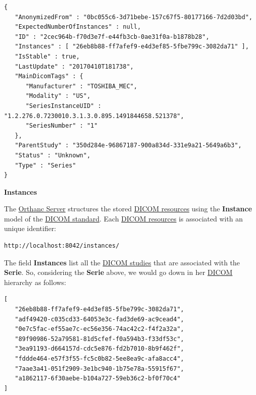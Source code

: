 \documentclass{tufte-book} %
\begin{document}
\begin{lstlisting}
{
   "AnonymizedFrom" : "0bc055c6-3d71bebe-157c67f5-80177166-7d2d03bd",
   "ExpectedNumberOfInstances" : null,
   "ID" : "2cec964b-f70d3e7f-e44fb3cb-0ae31f0a-b1878b28",
   "Instances" : [ "26eb8b88-ff7afef9-e4d3ef85-5fbe799c-3082da71" ],
   "IsStable" : true,
   "LastUpdate" : "20170410T181738",
   "MainDicomTags" : {
      "Manufacturer" : "TOSHIBA_MEC",
      "Modality" : "US",
      "SeriesInstanceUID" : "1.2.276.0.7230010.3.1.3.0.895.1491844658.521378",
      "SeriesNumber" : "1"
   },
   "ParentStudy" : "350d284e-96867187-900a834d-331e9a21-5649a6b3",
   "Status" : "Unknown",
   "Type" : "Series"
}
\end{lstlisting}


\clearpage


\textbf{Instances}

\hfill

The \href{https://www.orthanc-server.com/}{Orthanc Server} structures the stored \href{http://book.orthanc-server.com/users/rest.html#sending-dicom-images}{DICOM resources} using the \textbf{Instance} model of the \href{https://www.dicomstandard.org/current/}{DICOM standard}. Each \href{http://book.orthanc-server.com/users/rest.html#sending-dicom-images}{DICOM resources} is associated with an unique identifier:

\begin{lstlisting}
http://localhost:8042/instances/
\end{lstlisting}

\hfill

The field \textbf{Instances} list all the \href{http://book.orthanc-server.com/users/rest.html#sending-dicom-images}{DICOM studies} that are associated with the \textbf{Serie}. So, considering the \textbf{Serie} above, we would go down in her \href{http://book.orthanc-server.com/users/rest.html#sending-dicom-images}{DICOM} hierarchy as follows:

\begin{lstlisting}
[
   "26eb8b88-ff7afef9-e4d3ef85-5fbe799c-3082da71",
   "adf49420-c035cd33-64053e3c-fad3de69-ac9cead4",
   "0e7c5fac-ef55ae7c-ec56e356-74ac42c2-f4f2a32a",
   "89f90986-52a79581-81d5cfef-f0a594b3-f33df53c",
   "3ea91193-d664157d-cdc5e876-fd2b7010-8b9f462f",
   "fddde464-e57f3f55-fc5c0b82-5ee8ea9c-afa8acc4",
   "7aae3a41-051f2909-3e1bc940-1b75e78a-55915f67",
   "a1862117-6f30aebe-b104a727-59eb36c2-bf0f70c4"
]
\end{lstlisting}
\end{document}
